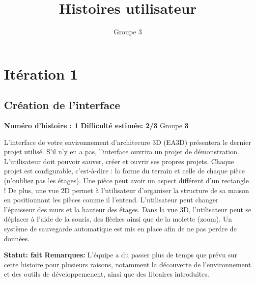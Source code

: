 \documentclass[a4paper]{article} \usepackage{framed} \usepackage{fullpage} \usepackage[french]{babel} \usepackage[utf8]{inputenc} \usepackage[T1]{fontenc}
\title{Histoires utilisateur} \author{Groupe 3}
\begin{document}
 \maketitle
\section{Itération 1}
\begin{framed}
\subsection{Création de l'interface}

\textbf{Numéro d'histoire : 1}  
\textbf{Difficulté estimée: 2/3}  Groupe \textbf{3}

L'interface de votre environnement d'architecure 3D (EA3D) présentera le dernier projet utilisé. S'il n'y en a pas, l'interface ouvrira un projet de démonstration. L'utilisateur doit pouvoir sauver, créer et ouvrir ses propres projets. Chaque projet est configurable, c'est-à-dire : la forme du terrain et celle de chaque pièce (n'oubliez pas les étages). Une pièce peut avoir un aspect différent d'un rectangle ! De plus, une vue 2D permet à l'utilisateur d'organiser la structure de sa maison en positionnant les pièces comme il l'entend. L'utilisateur peut changer l'épaisseur des murs et la hauteur des étages. Dans la vue 3D, l'utilisateur peut se déplacer à l'aide de la souris, des flèches ainsi que de la molette (zoom). Un système de sauvegarde automatique est mis en place afin de ne pas perdre de données.


\textbf{Statut: fait}  \textbf{Remarques:} L'équipe a du passer plus de temps que prévu sur cette histoire pour plusieurs raisons, notamment la découverte de l'environnement et des outils de développemenent, ainsi que des libraires introduites.
\end{framed}
\end{document}
